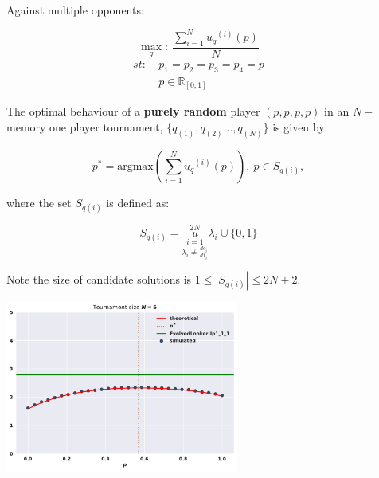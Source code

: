 \documentclass[usenames,dvipsnames,t]{beamer}
\newcommand{\R}{\mathbb{R}}
\begin{document}
\begin{columns}
\begin{column}{.45\linewidth}
        \textcolor{solarizedGreen}{Against multiple opponents:}
        \vspace{0.5cm}

        \[\max_q: \ \frac{\sum_{i=1} ^ {N} {u_q}^{(i)} (p)}{N}\]
        \begin{equation*}
            \begin{aligned}
            st: & \ p_1 = p_2 = p_3 = p_4 = p\\
                & \ p \in \R_{[0, 1]} 
            \end{aligned}
            \end{equation*}
            \vspace{0.3cm}

            \small{
            The optimal behaviour of a \textbf{purely random} player \((p, p, p, p)\)
            in an \(N-\)memory one player tournament, \(\{q_{(1)}, q_{(2)} \dots,q_{(N)} \}
            \) is given by:}
            \vspace{0.3cm}

            \[p^* = \text{argmax}(\displaystyle \sum_{i=1} ^ {N} {u_q}^{(i)} (p)), \ p \in S_{q(i)},\]
            \vspace{0.3cm}
            
            \small{
            where the set \(S_{q(i)}\) is defined as:}
            \vspace{0.3cm}

            \[ S_{q(i)} =  \overset{2N}{\underset{\lambda_i \neq \frac{do_i}{d1_i}}{\underset{i=1}{u}}} \lambda_i \cup \{0, 1\} \]
            \vspace{0.3cm}

            Note the size of candidate solutions is \( 1 \leq|S_{q(i)}| \leq 2N + 2\).
            \vspace{0.3cm}

            \begin{center}
                \includegraphics[width=0.6\textwidth]{static/random_vs_multiple}
            \end{center}
            \vspace{0.3cm}
    \end{column}
    \begin{column}{.05\linewidth}
    \end{column}
\end{columns}
\end{document}
